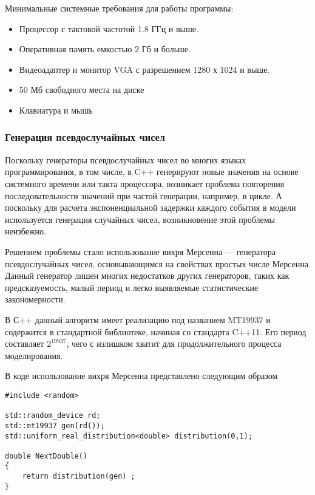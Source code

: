 Минимальные системные требования для работы программы:
\begin{itemize}
	\item Процессор с тактовой частотой 1.8 ГГц и выше.
	\item Оперативная память емкостью 2 Гб и больше.
	\item Видеоадаптер и монитор VGA с разрешением 1280 х 1024 и выше.
	\item 50 Мб свободного места на диске
	\item Клавиатура и мышь
	\end{itemize}

\subsubsection{Генерация псевдослучайных чисел}
Поскольку генераторы псевдослучайных чисел во многих языках программирования, в том числе, в C++ генерируют новые значения на основе системного времени или такта процессора, возникает проблема повторения последовательности значений при частой генерации, например, в цикле. А поскольку для расчета экспоненциальной задержки каждого события в модели используется генерация случайных чисел, возникновение этой проблемы неизбежно.

Решением проблемы стало использование вихря Мерсенна --- генератора псевдослучайных чисел, основывающимся на свойствах простых числе Мерсенна. Данный генератор лишен многих недостатков других генераторов, таких как предсказуемость, малый период и легко выявляемые статистические закономерности.

В С++ данный алгоритм имеет реализацию под названием MT19937 и содержится в стандартной библиотеке, начиная со стандарта C++11. Его период составляет $2^{19937}$, чего с излишком хватит для продолжительного процесса моделирования. 

В коде использование вихря Мерсенна представлено следующим образом
\begin{lstlisting}
#include <random>

std::random_device rd;
std::mt19937 gen(rd());
std::uniform_real_distribution<double> distribution(0,1);

double NextDouble()
{
	return distribution(gen) ;
}
\end{lstlisting}

